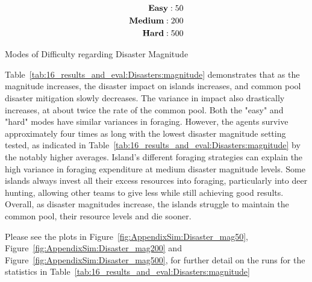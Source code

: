\begin{table}
    \begin{align*}
        \text{\textbf{Easy}}: 50 \\
        \text{\textbf{Medium}}: 200 \\
        \text{\textbf{Hard}}:  500 \\
    \end{align*}
    \caption{Modes of Difficulty regarding Disaster Magnitude}
    \label{tab:disaster-mag-modes}
\end{table}

Table~\ref{tab:16_results_and_eval:Disasters:magnitude} demonstrates that as the magnitude increases, the disaster impact on islands increases, and common pool disaster mitigation slowly decreases. The variance in impact also drastically increases, at about twice the rate of the common pool. Both the "easy" and "hard" modes have similar variances in foraging. However, the agents survive approximately four times as long with the lowest disaster magnitude setting tested, as indicated in Table~\ref{tab:16_results_and_eval:Disasters:magnitude} by the notably higher averages. Island's different foraging strategies can explain the high variance in foraging expenditure at medium disaster magnitude levels. Some islands always invest all their excess resources into foraging, particularly into deer hunting, allowing other teams to give less while still achieving good results. Overall, as disaster magnitudes increase, the islands struggle to maintain the common pool, their resource levels and die sooner. 

Please see the plots in Figure~\ref{fig:AppendixSim:Disaster_mag50}, Figure~\ref{fig:AppendixSim:Disaster_mag200} and Figure~\ref{fig:AppendixSim:Disaster_mag500}, for further detail on the runs for the statistics in Table~\ref{tab:16_results_and_eval:Disasters:magnitude}

